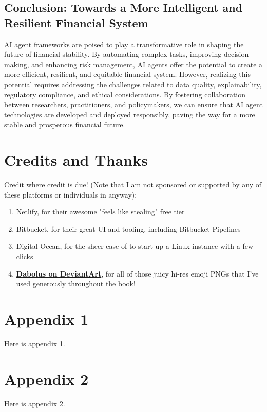 \documentclass[a4paper,headinclude=on,footinclude=on,12pt,oneside]{scrbook}
\newcommand{\link}[2]{\textbf{\textcolor{monokaiPink}{\href{#2}{#1}}}}
\begin{document}
\section*{Conclusion: Towards a More Intelligent and Resilient Financial System}

AI agent frameworks are poised to play a transformative role in shaping the future of financial stability. By automating complex tasks, improving decision-making, and enhancing risk management, AI agents offer the potential to create a more efficient, resilient, and equitable financial system. However, realizing this potential requires addressing the challenges related to data quality, explainability, regulatory compliance, and ethical considerations. By fostering collaboration between researchers, practitioners, and policymakers, we can ensure that AI agent technologies are developed and deployed responsibly, paving the way for a more stable and prosperous financial future.


\chapter*{Credits and Thanks}

Credit where credit is due! (Note that I am not sponsored or supported by any of these platforms or individuals in anyway):

\begin{enumerate}
\item Netlify, for their awesome "feels like stealing" free tier
\item Bitbucket, for their great UI and tooling, including Bitbucket Pipelines
\item Digital Ocean, for the sheer ease of to start up a Linux instance with a few clicks
\item \link{Dabolus on DeviantArt}{https://www.deviantart.com/dabolus}, for all of those juicy hi-res emoji PNGs that I've used generously throughout the book!
\end{enumerate}

\begin{appendices}

\chapter{Appendix 1}

Here is appendix 1.

\chapter{Appendix 2}

Here is appendix 2.

\end{appendices}
\end{document}
